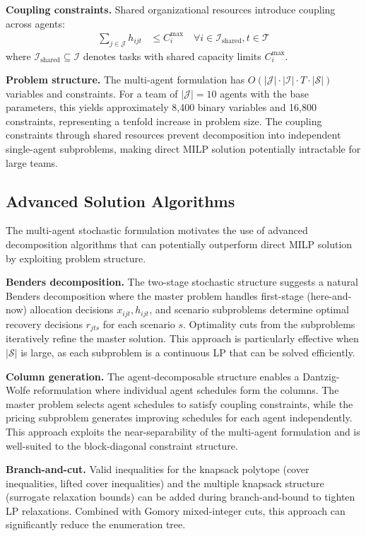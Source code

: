 \documentclass[preprint,review,11pt]{elsarticle}
\begin{document}
\textbf{Coupling constraints.} Shared organizational resources introduce coupling across agents:
\begin{align}
\sum_{j \in \mathcal{J}} h_{ijt} &\leq C_i^{\max} \quad \forall i \in \mathcal{I}_{\text{shared}}, t \in \mathcal{T}
\end{align}
where $\mathcal{I}_{\text{shared}} \subseteq \mathcal{I}$ denotes tasks with shared capacity limits $C_i^{\max}$.

\textbf{Problem structure.} The multi-agent formulation has $O(|\mathcal{J}| \cdot |\mathcal{I}| \cdot T \cdot |\mathcal{S}|)$ variables and constraints. For a team of $|\mathcal{J}| = 10$ agents with the base parameters, this yields approximately 8,400 binary variables and 16,800 constraints, representing a tenfold increase in problem size. The coupling constraints through shared resources prevent decomposition into independent single-agent subproblems, making direct MILP solution potentially intractable for large teams.

\subsection{Advanced Solution Algorithms}\label{sec:algorithms}

The multi-agent stochastic formulation motivates the use of advanced decomposition algorithms that can potentially outperform direct MILP solution by exploiting problem structure.

\textbf{Benders decomposition.} The two-stage stochastic structure suggests a natural Benders decomposition where the master problem handles first-stage (here-and-now) allocation decisions $x_{ijt}, h_{ijt}$, and scenario subproblems determine optimal recovery decisions $r_{jts}$ for each scenario $s$. Optimality cuts from the subproblems iteratively refine the master solution. This approach is particularly effective when $|\mathcal{S}|$ is large, as each subproblem is a continuous LP that can be solved efficiently.

\textbf{Column generation.} The agent-decomposable structure enables a Dantzig-Wolfe reformulation where individual agent schedules form the columns. The master problem selects agent schedules to satisfy coupling constraints, while the pricing subproblem generates improving schedules for each agent independently. This approach exploits the near-separability of the multi-agent formulation and is well-suited to the block-diagonal constraint structure.

\textbf{Branch-and-cut.} Valid inequalities for the knapsack polytope (cover inequalities, lifted cover inequalities) and the multiple knapsack structure (surrogate relaxation bounds) can be added during branch-and-bound to tighten LP relaxations. Combined with Gomory mixed-integer cuts, this approach can significantly reduce the enumeration tree.
\end{document}
